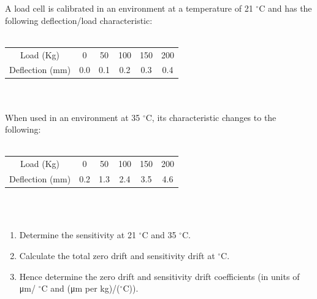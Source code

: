 \documentclass[a4paper,11pt,dvipsnames]{book}
\begin{document}
\begin{question}
A load cell is calibrated in an environment at a temperature of 21 $^{\circ}$C and has the following
deflection/load characteristic: \\ \\

\begin{tabular}{cccccc}
\hline 
Load (Kg) & 0 & 50 & 100 & 150 & 200 \\ 
Deflection (mm) & 0.0 & 0.1 & 0.2 & 0.3 & 0.4 \\ 
\hline 
\end{tabular}  \\ \\

When used in an environment at 35 $^{\circ}$C, its characteristic changes to the following: \\ \\

\begin{tabular}{cccccc}
\hline 
Load (Kg) & 0 & 50 & 100 & 150 & 200 \\ 
Deflection (mm) & 0.2 & 1.3 & 2.4 & 3.5 & 4.6 \\ 
\hline 
\end{tabular} \\ \\

\begin{enumerate}
\item Determine the sensitivity at 21 $^{\circ}$C and 35 $^{\circ}$C.
\item Calculate the total zero drift and sensitivity drift at $^{\circ}$C.
\item Hence determine the zero drift and sensitivity drift coefficients (in units of μm/ $^{\circ}$C and
(μm per kg)/($^{\circ}$C)).
\end{enumerate}

\examspace*{5em}

\end{question}
\begin{solution}


\end{solution}
\end{document}
